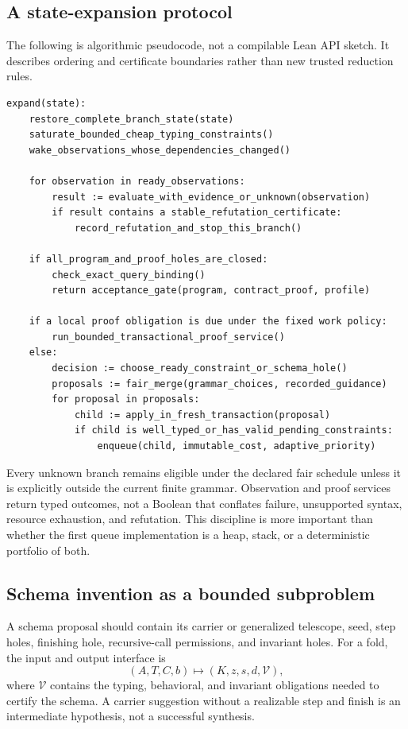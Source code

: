 \documentclass[11pt,a4paper]{article}
\theoremstyle{remark}
\begin{document}
\subsection{A state-expansion protocol}

The following is algorithmic pseudocode, not a compilable Lean API sketch.
It describes ordering and certificate boundaries rather than new trusted
reduction rules.

\begin{minipage}{\linewidth}
\begin{lstlisting}
expand(state):
    restore_complete_branch_state(state)
    saturate_bounded_cheap_typing_constraints()
    wake_observations_whose_dependencies_changed()

    for observation in ready_observations:
        result := evaluate_with_evidence_or_unknown(observation)
        if result contains a stable_refutation_certificate:
            record_refutation_and_stop_this_branch()

    if all_program_and_proof_holes_are_closed:
        check_exact_query_binding()
        return acceptance_gate(program, contract_proof, profile)

    if a local proof obligation is due under the fixed work policy:
        run_bounded_transactional_proof_service()
    else:
        decision := choose_ready_constraint_or_schema_hole()
        proposals := fair_merge(grammar_choices, recorded_guidance)
        for proposal in proposals:
            child := apply_in_fresh_transaction(proposal)
            if child is well_typed_or_has_valid_pending_constraints:
                enqueue(child, immutable_cost, adaptive_priority)
\end{lstlisting}
\end{minipage}

Every unknown branch remains eligible under the declared fair schedule unless
it is explicitly outside the current finite grammar. Observation and proof
services return typed outcomes, not a Boolean that conflates failure,
unsupported syntax, resource exhaustion, and refutation. This discipline is
more important than whether the first queue implementation is a heap, stack,
or a deterministic portfolio of both.

\subsection{Schema invention as a bounded subproblem}

A schema proposal should contain its carrier or generalized telescope, seed,
step holes, finishing hole, recursive-call permissions, and invariant holes.
For a fold, the input and output interface is
\[
 (A,T,C,b)\longmapsto
 (K,z,s,d,\mathcal V),
\]
where $\mathcal V$ contains the typing, behavioral, and invariant obligations
needed to certify the schema. A carrier suggestion without a realizable step
and finish is an intermediate hypothesis, not a successful synthesis.
\end{document}
